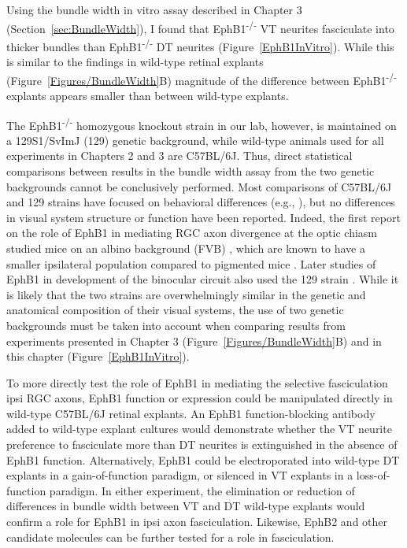 \label{sec:EphB1Fascic}
Using the bundle width in vitro assay described in Chapter 3 (Section~\ref{sec:BundleWidth}), I found that EphB1\textsuperscript{-/-} VT neurites fasciculate into thicker bundles than EphB1\textsuperscript{-/-} DT neurites (Figure~\ref{EphB1InVitro}).
While this is similar to the findings in wild-type retinal explants (Figure~\ref{Figures/BundleWidth}B) magnitude of the difference between EphB1\textsuperscript{-/-} explants appears smaller than between wild-type explants.

The EphB1\textsuperscript{-/-} homozygous knockout strain in our lab, however, is maintained on a 129S1/SvImJ (129) genetic background, while wild-type animals used for all experiments in Chapters 2 and 3 are C57BL/6J.
Thus, direct statistical comparisons between results in the bundle width assay from the two genetic backgrounds cannot be conclusively performed.
Most comparisons of C57BL/6J and 129 strains have focused on behavioral differences (e.g., ), but no differences in visual system structure or function have been reported.
Indeed, the first report on the role of EphB1 in mediating RGC axon divergence at the optic chiasm studied mice on an albino background (FVB) \cite{williams2003ephrin}, which are known to have a smaller ipsilateral population compared to pigmented mice \cite{guillery1996albinos}.
Later studies of EphB1 in development of the binocular circuit also used the 129 strain \cite{rebsam2009switching}. 
While it is likely that the two strains are overwhelmingly similar in the genetic and anatomical composition of their visual systems, the use of two genetic backgrounds must be taken into account when comparing results from experiments presented in Chapter 3 (Figure~\ref{Figures/BundleWidth}B) and in this chapter (Figure~\ref{EphB1InVitro}).

To more directly test the role of EphB1 in mediating the selective fasciculation ipsi RGC axons, EphB1 function or expression could be manipulated directly in wild-type C57BL/6J retinal explants.
An EphB1 function-blocking antibody added to wild-type explant cultures would demonstrate whether the VT neurite preference to fasciculate more than DT neurites is extinguished in the absence of EphB1 function.
Alternatively, EphB1 could be electroporated into wild-type DT explants in a gain-of-function paradigm, or silenced in VT explants in a loss-of-function paradigm.
In either experiment, the elimination or reduction of differences in bundle width between VT and DT wild-type explants would confirm a role for EphB1 in ipsi axon fasciculation.
Likewise, EphB2 and other candidate molecules can be further tested for a role in fasciculation.

